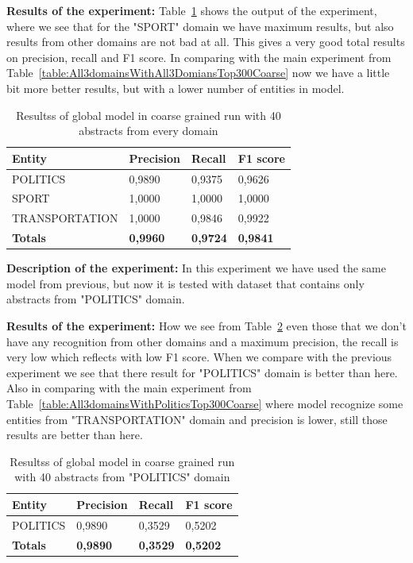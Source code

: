 \documentclass[thesis=M,english]{FITthesis}[2018/05/30]
\begin{document}
	\textbf{Results of the experiment:} Table~\ref{table:GlobalDomainWithAllAbstractsTop40Coarse} shows the output of the experiment, where we see that for the "SPORT" domain we have maximum results, but also results from other domains are not bad at all. This gives a very good total results on precision, recall and F1 score. In comparing with the main experiment from Table~\ref{table:All3domainsWithAll3DomiansTop300Coarse} now we have a little bit more better results, but with a lower number of entities in model.
	
	\begin{table}[H]\centering
		\begin{tabular}{|l|l|l|l|}
			\hline {\textbf{Entity}} & {\textbf{Precision}} & {\textbf{Recall}} & {\textbf{F1 score}}\\\hline
				POLITICS & 0,9890 & 0,9375 & 0,9626\\
				SPORT & 1,0000 & 1,0000 & 1,0000\\
				TRANSPORTATION & 1,0000 & 0,9846 & 0,9922\\\hline
				\textbf{Totals} & \textbf{0,9960} & \textbf{0,9724} & \textbf{0,9841}\\\hline
		\end{tabular}
		\caption{Resultss of global model in coarse grained run with 40 abstracts from every domain \label{table:GlobalDomainWithAllAbstractsTop40Coarse}}
	\end{table}


	\textbf{Description of the experiment:} In this experiment we have used the same model from previous, but now it is tested with dataset that contains only abstracts from "POLITICS" domain.  

	\textbf{Results of the experiment:} How we see from Table~\ref{table:GlobalDomainWithPoliticsTop40Coarse} even those that we don't have any recognition from other domains and a maximum precision, the recall is very low which reflects with low F1 score. When we compare with the previous experiment we see that there result for "POLITICS" domain is better than here. Also in comparing with the main experiment from Table~\ref{table:All3domainsWithPoliticsTop300Coarse} where model recognize some entities from "TRANSPORTATION" domain and precision is lower, still those results are better than here. 

	\begin{table}[H]\centering
		\begin{tabular}{|l|l|l|l|}
			\hline {\textbf{Entity}} & {\textbf{Precision}} & {\textbf{Recall}} & {\textbf{F1 score}}\\\hline
				POLITICS & 0,9890 & 0,3529 & 0,5202\\\hline
				\textbf{Totals} & \textbf{0,9890} & \textbf{0,3529} & \textbf{0,5202}\\\hline
		\end{tabular}
		\caption{Resultss of global model in coarse grained run with 40 abstracts from "POLITICS" domain \label{table:GlobalDomainWithPoliticsTop40Coarse}}
	\end{table}
\end{document}
